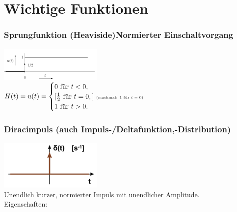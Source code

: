 
\section{Wichtige Funktionen}

\begin{multicols}{2}
  \small
  \subsubsection*{Sprungfunktion (Heaviside)\tiny Normierter Einschaltvorgang}
  \includegraphics[width = 5cm]{include/Wichtige Funktionen/img/Sprungfunktion.png}
  \\ $H(t) = u(t) = \begin{cases}
      0 \textrm{ für }  t<0,                                                     \\
      [\frac{1}{2} \textrm{ für }  t = 0,] \textrm{ \tiny(machmal: 1 für $t=0$)} \\
      1 \textrm{ für }  t >0.
    \end{cases}   $
  \\
  \subsubsection*{Diracimpuls \tiny (auch Impuls-/Deltafunktion,-Distribution)}
  \includegraphics[width = 5cm]{include/Wichtige Funktionen/img/Impulsfunktion.png}
  \\ \footnotesize
  Unendlich kurzer, normierter Impuls mit unendlicher Amplitude.
  \\Eigenschaften:\\
\end{multicols}
